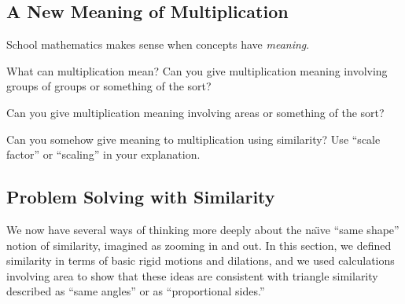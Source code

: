 %
%
%


\subsection{A New Meaning of Multiplication}
School mathematics makes sense when concepts have \emph{meaning}.  

\begin{question} 
What can multiplication mean?  Can you give multiplication meaning involving groups of groups or
something of the sort?
\end{question}
\QM

\begin{question} 
Can you give multiplication meaning involving areas or something of the sort?
\end{question}
\QM

\begin{question} 
Can you somehow give meaning to multiplication using similarity?  Use ``scale factor'' or ``scaling'' in your explanation.
\end{question}
\QM

\newpage 

\subsection{Problem Solving with Similarity} 


We now have several ways of thinking more deeply about the na\"{\i}ve ``same shape'' notion of similarity, imagined as zooming in and out.  In this section, we defined similarity in terms of basic rigid motions and dilations, and we used calculations involving area to show that these ideas are consistent with triangle similarity described as ``same angles''  or as ``proportional sides.''

